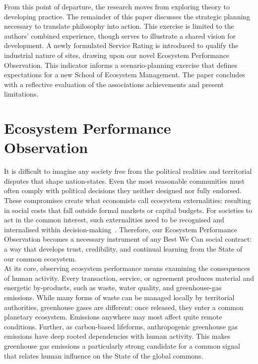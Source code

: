 \documentclass[12pt, oneside]{article}   	%
\begin{document}
From this point of departure, the research moves from exploring theory to developing practice.
The remainder of this paper discusses the strategic planning necessary to translate philosophy into action.
This exercise is limited to the authors’ combined experience, though serves to illustrate a shared vision for development.
A newly formulated Service Rating is introduced to qualify the industrial nature of sites, drawing upon our novel Ecosystem Performance Observation.
This indicator informs a scenario-planning exercise that defines expectations for a new School of Ecosystem Management.
The paper concludes with a reflective evaluation of the associations achievements and present limitations.\\

\section{Ecosystem Performance Observation}

It is difficult to imagine any society free from the political realities and territorial disputes that shape nation-states.
Even the most reasonable communities must often comply with political decisions they neither designed nor fully endorsed.
These compromises create what economists call ecosystem externalities: resulting in social costs that fall outside formal markets or capital budgets.
For societies to act in the common interest, such externalities need to be recognised and internalised within decision-making~\cite{rc1}.
Therefore, our Ecosystem Performance Observation becomes a necessary instrument of any Best We Can social contract: a way that develops trust, credibility, and continual learning from the State of our common ecosystem.\\

At its core, observing ecosystem performance means examining the consequences of human activity.
Every transaction, service, or agreement produces material and energetic by-products, such as waste, water quality, and greenhouse-gas emissions.
While many forms of waste can be managed locally by territorial authorities, greenhouse gases are different: once released, they enter a common planetary ecosystem.
Emissions anywhere may most affect quite remote conditions.
Further, as carbon-based lifeforms, anthropogenic greenhouse gas emissions have deep rooted dependencies with human activity.
This makes greenhouse gas emissions a particularly strong candidate for a common signal that relates human influence on the State of the global commons.\\
\end{document}
